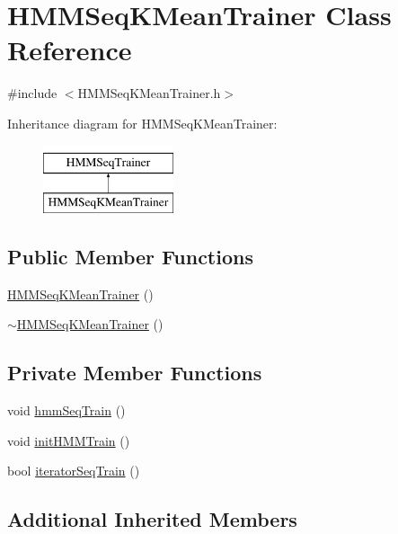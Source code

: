 \hypertarget{class_h_m_m_seq_k_mean_trainer}{\section{H\+M\+M\+Seq\+K\+Mean\+Trainer Class Reference}
\label{class_h_m_m_seq_k_mean_trainer}
}


{\ttfamily \#include $<$H\+M\+M\+Seq\+K\+Mean\+Trainer.\+h$>$}

Inheritance diagram for H\+M\+M\+Seq\+K\+Mean\+Trainer\+:\begin{figure}[H]
\begin{center}
\leavevmode
\includegraphics[height=2.000000cm]{class_h_m_m_seq_k_mean_trainer}
\end{center}
\end{figure}
\subsection*{Public Member Functions}
\begin{DoxyCompactItemize}
\item 
\hyperlink{class_h_m_m_seq_k_mean_trainer_a783eaefd9b12b2df1d7fdc2cb15713b6}{H\+M\+M\+Seq\+K\+Mean\+Trainer} ()
\item 
\hyperlink{class_h_m_m_seq_k_mean_trainer_a42591784f7b48776a3ac5542a62b8d46}{$\sim$\+H\+M\+M\+Seq\+K\+Mean\+Trainer} ()
\end{DoxyCompactItemize}
\subsection*{Private Member Functions}
\begin{DoxyCompactItemize}
\item 
void \hyperlink{class_h_m_m_seq_k_mean_trainer_a0d76c424f623667cff7ec0262d06f172}{hmm\+Seq\+Train} ()
\item 
void \hyperlink{class_h_m_m_seq_k_mean_trainer_aeb81a388b2d8070cdba12e911826101e}{init\+H\+M\+M\+Train} ()
\item 
bool \hyperlink{class_h_m_m_seq_k_mean_trainer_a988cda8fc52326b3aef67a2c6b91588b}{iterator\+Seq\+Train} ()
\end{DoxyCompactItemize}
\subsection*{Additional Inherited Members}



